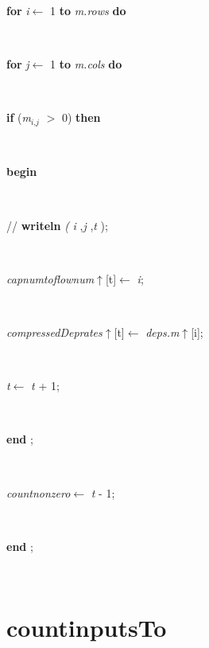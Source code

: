 \documentclass[10pt, a4paper]{article}
\begin{document}
\begin{tabbing}
\+\parbox{14cm}{\textsf {\textbf {for } \textsf{\textit{i}$\leftarrow$ 1} \textbf{ to } \textsf{\textit{m.rows}} \textbf{ do } }}\\
\+\parbox{14cm}{\textsf {\textbf {for } \textsf{\textit{j}$\leftarrow$ 1} \textbf{ to } \textsf{\textit{m.cols}} \textbf{ do } }}\\
\+\parbox{14cm}{\textsf {\textbf {if } \textsf{(\textit{m}$_{\textit{i}, \textit{j}}$ $>$ 0)} \textbf{ then } }}\\
\<\parbox{14cm}{\textsf{\textbf{begin} }}\\
\parbox{14cm}{\textsf{//  \textbf{writeln} \textit{(} \textit{i} ,\textit{j} ,\textit{t} );}}\\
\parbox{14cm}{\textsf{\textit{capnumtoflownum}$\uparrow$\textit{}[t]$\leftarrow$ \textit{i}}; }\\
\parbox{14cm}{\textsf{\textit{compressedDeprates}$\uparrow$\textit{}[t]$\leftarrow$ \textit{deps.m}$\uparrow$\textit{}[i]}; }\\
\parbox{14cm}{\textsf{\textit{t}$\leftarrow$ \textit{t} + 1}; }\\
\<\-\parbox{14cm}{\textsf{\textbf{end} ;}}\\
\parbox{14cm}{\textsf{\textit{countnonzero}$\leftarrow$ \textit{t} - 1}; }\\
\<\-\<\-\<\-\<\-\<\-\parbox{14cm}{\textsf{\textbf{end} ;}}\\
\end{tabbing}
\section{countinputsTo}\label{sec:harmonyplancountinputsTo}
\end{document}
